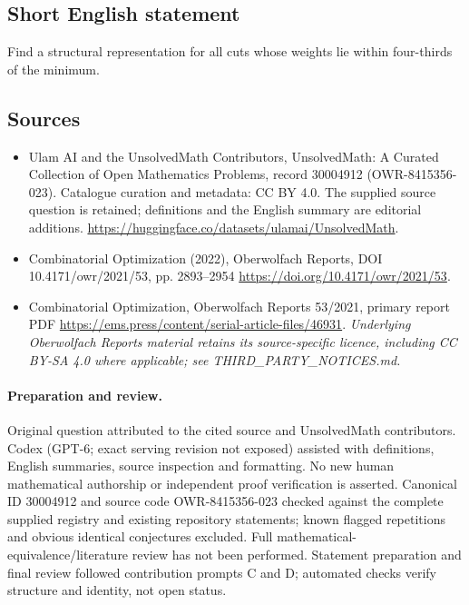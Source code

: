 \documentclass[11pt]{article}
\begin{document}
\subsection{Short English statement}
Find a structural representation for all cuts whose weights lie within four-thirds of the minimum.
\subsection{Sources}
\begin{itemize}
\item[\hypertarget{source:30004912:1}{S1}] Ulam AI and the UnsolvedMath Contributors, UnsolvedMath: A Curated Collection of Open Mathematics Problems, record 30004912 (OWR-8415356-023). Catalogue curation and metadata: CC BY 4.0. The supplied source question is retained; definitions and the English summary are editorial additions.
\url{https://huggingface.co/datasets/ulamai/UnsolvedMath}.
\item[\hypertarget{source:30004912:2}{S2}] Combinatorial Optimization (2022), Oberwolfach Reports, DOI 10.4171/owr/2021/53, pp. 2893--2954
\url{https://doi.org/10.4171/owr/2021/53}.
\item[\hypertarget{source:30004912:3}{S3}] Combinatorial Optimization, Oberwolfach Reports 53/2021, primary report PDF
\url{https://ems.press/content/serial-article-files/46931}.
\textit{Underlying Oberwolfach Reports material retains its source-specific licence, including CC BY-SA 4.0 where applicable; see THIRD\_PARTY\_NOTICES.md.}
\end{itemize}
\paragraph{Preparation and review.}
Original question attributed to the cited source and UnsolvedMath contributors. Codex (GPT-6; exact serving revision not exposed) assisted with definitions, English summaries, source inspection and formatting. No new human mathematical authorship or independent proof verification is asserted. Canonical ID 30004912 and source code OWR-8415356-023 checked against the complete supplied registry and existing repository statements; known flagged repetitions and obvious identical conjectures excluded. Full mathematical-equivalence/literature review has not been performed. Statement preparation and final review followed contribution prompts C and D; automated checks verify structure and identity, not open status.
\label{end:30004912}
\end{document}
